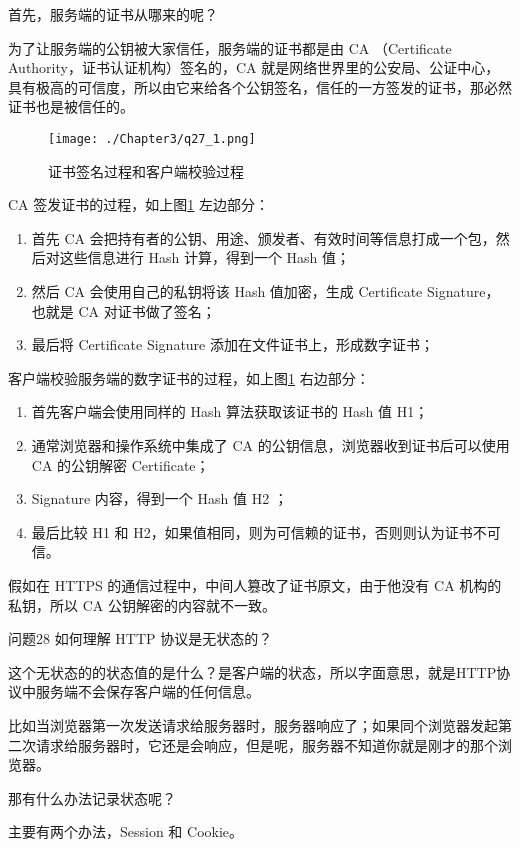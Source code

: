 \documentclass[cn,11pt,color=blue,lang=cn]{elegantbook}
\begin{document}
\begin{solution}
首先，服务端的证书从哪来的呢？

为了让服务端的公钥被大家信任，服务端的证书都是由 CA （Certificate Authority，证书认证机构）签名的，CA 就是网络世界里的公安局、公证中心，具有极高的可信度，所以由它来给各个公钥签名，信任的一方签发的证书，那必然证书也是被信任的。

\begin{figure}[htbp]
\centering
\texttt{[image: ./Chapter3/q27\_1.png]}
\caption{证书签名过程和客户端校验过程}
\label{fig27_1}
\end{figure}

CA 签发证书的过程，如上图\ref{fig27_1} 左边部分：
\begin{enumerate}
	\item 首先 CA 会把持有者的公钥、用途、颁发者、有效时间等信息打成一个包，然后对这些信息进行 Hash 计算，得到一个 Hash 值；
	\item 然后 CA 会使用自己的私钥将该 Hash 值加密，生成 Certificate Signature，也就是 CA 对证书做了签名；
	\item 最后将 Certificate Signature 添加在文件证书上，形成数字证书；
\end{enumerate}

客户端校验服务端的数字证书的过程，如上图\ref{fig27_1} 右边部分：
\begin{enumerate}
	\item 首先客户端会使用同样的 Hash 算法获取该证书的 Hash 值 H1；
	\item 通常浏览器和操作系统中集成了 CA 的公钥信息，浏览器收到证书后可以使用 CA 的公钥解密 Certificate；
	\item Signature 内容，得到一个 Hash 值 H2 ；
	\item 最后比较 H1 和 H2，如果值相同，则为可信赖的证书，否则则认为证书不可信。
\end{enumerate}
假如在 HTTPS 的通信过程中，中间人篡改了证书原文，由于他没有 CA 机构的私钥，所以 CA 公钥解密的内容就不一致。

\end{solution}


\begin{custom}{问题28}
如何理解 HTTP 协议是无状态的？
\end{custom}
\begin{solution}
这个无状态的的状态值的是什么？是客户端的状态，所以字面意思，就是HTTP协议中服务端不会保存客户端的任何信息。

比如当浏览器第一次发送请求给服务器时，服务器响应了；如果同个浏览器发起第二次请求给服务器时，它还是会响应，但是呢，服务器不知道你就是刚才的那个浏览器。

那有什么办法记录状态呢？

主要有两个办法，Session 和 Cookie。
\end{solution}
\end{document}
